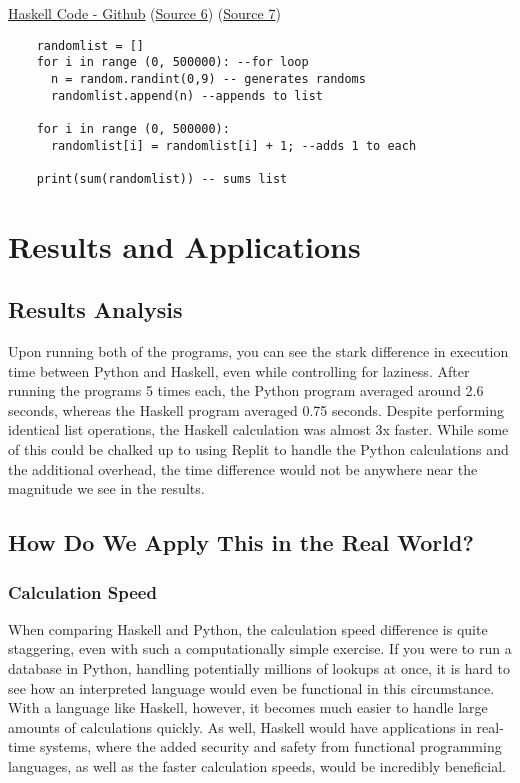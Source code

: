 \documentclass{article}
\begin{document}
 \medskip\href{https://github.com/ehombledal/ProgLang354/blob/main/Report/Part1/HaskellPaperExample.hs} {Haskell Code - Github}
 (\href{https://stackoverflow.com/questions/30994484/haskell-generate-and-use-the-same-random-list}{Source 6})
 (\href{https://stackoverflow.com/questions/5968614/how-to-get-a-programs-running-time-in-haskell}{Source 7})
 
     \begin{lstlisting}
    randomlist = []
    for i in range (0, 500000): --for loop
      n = random.randint(0,9) -- generates randoms
      randomlist.append(n) --appends to list
    
    for i in range (0, 500000):
      randomlist[i] = randomlist[i] + 1; --adds 1 to each
    
    print(sum(randomlist)) -- sums list

    \end{lstlisting}
 

\section{Results and Applications}
    \subsection{Results Analysis}
    \medskip\noindent Upon running both of the programs, you can see the stark difference in execution time between Python and Haskell, even while controlling for laziness. After running the programs 5 times each, the Python program averaged around 2.6 seconds, whereas the Haskell program averaged 0.75 seconds. Despite performing identical list operations, the Haskell calculation was almost 3x faster. While some of this could be chalked up to using Replit to handle the Python calculations and the additional overhead, the time difference would not be anywhere near the magnitude we see in the results. 
    
    \subsection{How Do We Apply This in the Real World?}
        \subsubsection{Calculation Speed}
        When comparing Haskell and Python, the calculation speed difference is quite staggering, even with such a computationally simple exercise. If you were to run a database in Python, handling potentially millions of lookups at once, it is hard to see how an interpreted language would even be functional in this circumstance. With a language like Haskell, however, it becomes much easier to handle large amounts of calculations quickly. As well, Haskell would have applications in real-time systems, where the added security and safety from functional programming languages, as well as the faster calculation speeds, would be incredibly beneficial. 
\end{document}
